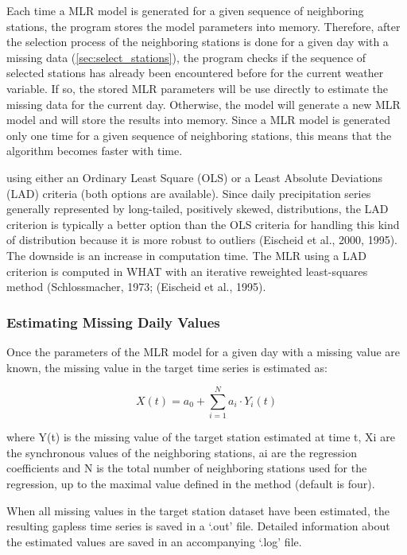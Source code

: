 \documentclass[TechnicalNoteMeteo.tex]{subfiles}
\begin{document}
Each time a MLR model is generated for a given sequence of neighboring stations, the program stores the model parameters into memory. Therefore, after the selection process of the neighboring stations is done for a given day with a missing data (\cref{sec:select_stations}), the program checks if the sequence of selected stations has already been encountered before for the current weather variable. If so, the stored MLR parameters will be use directly to estimate the missing data for the current day. Otherwise, the model will generate a new MLR model and will store the results into memory. Since a MLR model is generated only one time for a given sequence of neighboring stations, this means that the algorithm becomes faster with time.

using either an Ordinary Least Square (OLS) or a Least Absolute Deviations (LAD) criteria (both options are available). Since daily precipitation series generally represented by long-tailed, positively skewed, distributions, the LAD criterion is typically a better option than the OLS criteria for handling this kind of distribution because it is more robust to outliers (Eischeid et al., 2000, 1995). The downside is an increase in computation time. The MLR using a LAD criterion is computed in WHAT with an iterative reweighted least-squares method (Schlossmacher, 1973; (Eischeid et al., 1995).


\subsubsection{Estimating Missing Daily Values}

Once the parameters of the MLR model for a given day with a missing value are known, the missing value in the target time series is estimated as:

\begin{equation}
    X(t) = a_0 + \sum_{i=1}^{N} a_i \cdot Y_i(t)
\end{equation}

where Y(t) is the missing value of the target station estimated at time t, Xi are the synchronous values of the neighboring stations, ai are the regression coefficients and N is the total number of neighboring stations used for the regression, up to the maximal value defined in the method (default is four).

When all missing values in the target station dataset have been estimated, the resulting gapless time series is saved in a `.out' file. Detailed information about the estimated values are saved in an accompanying `.log' file.
\end{document}
